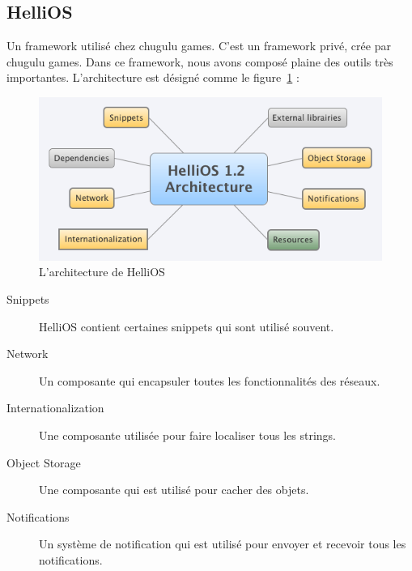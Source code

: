 
\subsection{HelliOS} %

Un framework utilisé chez chugulu games. C'est un framework privé, crée par chugulu games. Dans ce framework, nous avons composé plaine des outils très importantes. L'architecture est désigné comme le figure~\ref{fig:XMinds_HelliOSArchitecture} :

\begin{figure}[htbp]
	\centering
		\includegraphics[width=6in]{XMinds/HelliOSArchitecture.png}
	\caption{L'architecture de HelliOS}
	\label{fig:XMinds_HelliOSArchitecture}
\end{figure}

\begin{description}
	\item[Snippets] HelliOS contient certaines snippets qui sont utilisé souvent. 
	\item[Network] Un composante qui encapsuler toutes les fonctionnalités des réseaux.
	\item[Internationalization] Une composante utilisée pour faire localiser tous les strings. 
	\item[Object Storage] Une composante qui est utilisé pour cacher des objets. 
	\item[Notifications] Un système de notification qui est utilisé pour envoyer et recevoir tous les notifications.
\end{description}





